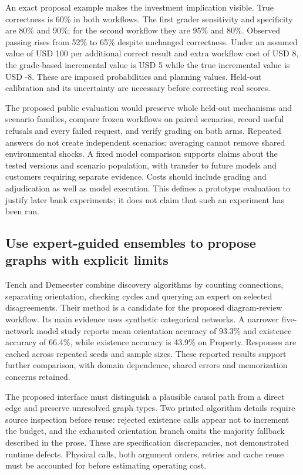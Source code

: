 An exact proposal example makes the investment implication visible. True
correctness is 60\% in both workflows. The first grader sensitivity and
specificity are 80\% and 90\%; for the second workflow they are 95\% and
80\%. Observed passing rises from 52\% to 65\% despite unchanged
correctness. Under an assumed value of USD 100 per additional correct
result and extra workflow cost of USD 8, the grade-based incremental
value is USD 5 while the true incremental value is USD -8. These are
imposed probabilities and planning values. Held-out calibration and its
uncertainty are necessary before correcting real scores.
\citep{exec20_validity_reference}

The proposed public evaluation would preserve whole held-out mechanisms
and scenario families, compare frozen workflows on paired scenarios,
record useful refusals and every failed request, and verify grading on
both arms. Repeated answers do not create independent scenarios;
averaging cannot remove shared environmental shocks. A fixed model
comparison supports claims about the tested versions and scenario
population, with transfer to future models and customers requiring
separate evidence. Costs should include grading and adjudication as well
as model execution. This defines a prototype evaluation to justify later
bank experiments; it does not claim that such an experiment has been
run.

\hypertarget{use-expert-guided-ensembles-to-propose-graphs-with-explicit-limits}{%
\subsection{Use expert-guided ensembles to propose graphs with explicit
limits}\label{use-expert-guided-ensembles-to-propose-graphs-with-explicit-limits}}

Tench and Demeester combine discovery algorithms by counting
connections, separating orientation, checking cycles and querying an
expert on selected disagreements. Their method is a candidate for the
proposed diagram-review workflow. Its main evidence uses synthetic
categorical networks. A narrower five-network model study reports mean
orientation accuracy of 93.3\% and existence accuracy of 66.4\%, while
existence accuracy is 43.9\% on Property. Responses are cached across
repeated seeds and sample sizes. These reported results support further
comparison, with domain dependence, shared errors and memorization
concerns retained. \citep{exec20_expert_averaging}

The proposed interface must distinguish a plausible causal path from a
direct edge and preserve unresolved graph types. Two printed algorithm
details require source inspection before reuse: rejected existence calls
appear not to increment the budget, and the exhausted orientation branch
omits the majority fallback described in the prose. These are
specification discrepancies, not demonstrated runtime defects. Physical
calls, both argument orders, retries and cache reuse must be accounted
for before estimating operating cost.
\citep{exec20_expert_averaging_reference}

